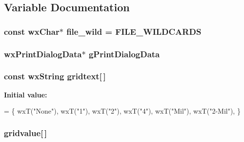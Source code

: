\subsection{Variable Documentation}
\hypertarget{a00226_a4841d82d107bf3e5331296d3527b192d}{
\subsubsection[{file\-\_\-wild}]{\setlength{\rightskip}{0pt plus 5cm}const wx\-Char$\ast$ file\-\_\-wild = {\bf F\-I\-L\-E\-\_\-\-W\-I\-L\-D\-C\-A\-R\-D\-S}\hspace{0.3cm}{\ttfamily [static]}}}\label{a00226_a4841d82d107bf3e5331296d3527b192d}
\hypertarget{a00226_a896ed5b078417657f1ceef1e87abe705}{
\subsubsection[{g\-Print\-Dialog\-Data}]{\setlength{\rightskip}{0pt plus 5cm}wx\-Print\-Dialog\-Data$\ast$ g\-Print\-Dialog\-Data}}\label{a00226_a896ed5b078417657f1ceef1e87abe705}
\hypertarget{a00226_a78f09467cace2629c2a2374a7f4bdc07}{
\subsubsection[{gridtext}]{\setlength{\rightskip}{0pt plus 5cm}const wx\-String gridtext\mbox{[}$\,$\mbox{]}}}\label{a00226_a78f09467cace2629c2a2374a7f4bdc07}
{\bfseries Initial value\-:}
\begin{DoxyCode}
=
\{
    wxT(\textcolor{stringliteral}{"None"}),
    wxT(\textcolor{stringliteral}{"1"}),
    wxT(\textcolor{stringliteral}{"2"}),
    wxT(\textcolor{stringliteral}{"4"}),
    wxT(\textcolor{stringliteral}{"Mil"}),
    wxT(\textcolor{stringliteral}{"2-Mil"}),
\}
\end{DoxyCode}
\hypertarget{a00226_a75782416c96d40b05fd547805f028dbd}{
\subsubsection[{gridvalue}]{ gridvalue\mbox{[}$\,$\mbox{]}}}\label{a00226_a75782416c96d40b05fd547805f028dbd}
